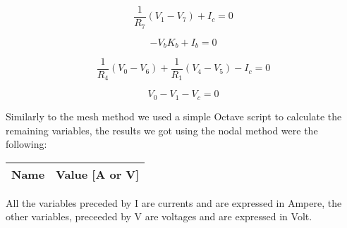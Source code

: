 \begin{equation}
  \frac{1}{R_7} (V_1-V_7) + I_c = 0
  \label{eq14}
\end{equation}

\begin{equation}
  -V_b K_b + I_b = 0
  \label{eq15}
\end{equation}

\begin{equation}
  \frac{1}{R_4} (V_0-V_6) + \frac{1}{R_1} (V_4-V_5) - I_c = 0
  \label{eq16}
\end{equation}

\begin{equation}
  V_0 - V_1 - V_c = 0
  \label{eq17}
\end{equation}

Similarly to the mesh method we used a simple Octave script to calculate the remaining variables, the results we got using the nodal method were the following: 

\begin{center}
  \begin{tabular}{ | c | c | }
    \hline    
    {\bf Name} & {\bf Value [A or V]} \\ \hline
    
    \hline
  \end{tabular}
\end{center}
All the variables preceded by I are currents and are expressed in Ampere, the other variables, preceeded by V are voltages and are expressed in Volt.





